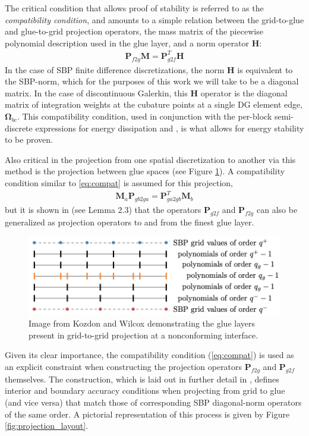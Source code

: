 The critical condition that allows proof of stability is referred to as the
\emph{compatibility condition}, and amounts to a simple relation between the
grid-to-glue and glue-to-grid projection operators, the mass matrix of the
piecewise polynomial description used in the glue layer, and a norm operator
$\pmb{H}$:
\begin{align}
\pmb{P}_{f2g}\pmb{M} = \pmb{P}_{g2f}^{T}\pmb{H} \label{eq:compat}
\end{align}
In the case of SBP finite difference discretizations, the norm $\pmb{H}$ is equivalent
to the SBP-norm, which for the purposes of this work we will take to be
a diagonal matrix. In the case of discontinuous Galerkin, this $\pmb{H}$ operator is
the diagonal matrix of integration weights at the cubature points at a single
DG element edge, $\pmb{\Omega}_{bc}$.  This compatibility condition, used in conjunction with
the per-block semi-discrete expressions for energy dissipation  and
, is what allows for energy stability to be proven.

Also critical in the projection from one spatial discretization to another via this
method is the projection between glue spaces (see Figure \ref{fig:glue_layers}). A
compatibility condition similar to \ref{eq:compat} is assumed for this projection,
\begin{align}
	\pmb{M}_{a}\pmb{P}_{gb2ga} = \pmb{P}_{ga2gb}^{T}\pmb{M}_{b} \label{eq:compat_glues}
\end{align}
but it is shown in \cite{kozdon2016stable} (see Lemma 2.3) that the operators $\pmb{P}_{g2f}$ and
$\pmb{P}_{f2g}$ can also be generalized as projection operators to and from the finest
glue layer.

\begin{figure}
\centering
\includegraphics[width=0.8\linewidth,trim=4 4 4 4,clip]{figures/glue_layers.png}
\caption{Image from Kozdon and Wilcox \cite{kozdon2016stable} demonstrating the glue
         layers present in grid-to-grid projection at a nonconforming interface.}
\label{fig:glue_layers}
\end{figure}

Given its clear importance, the compatibility condition (\ref{eq:compat}) is used as an explicit
constraint when constructing the projection operators $\pmb{P}_{f2g}$ and $\pmb{P}_{g2f}$
themselves. The construction, which is laid out in further detail in \cite{kozdon2016stable},
defines interior and boundary accuracy conditions when projecting from grid to glue
(and vice versa) that match those of corresponding SBP diagonal-norm operators of the
same order. A pictorial representation of this process is given by Figure \ref{fig:projection_layout}.

